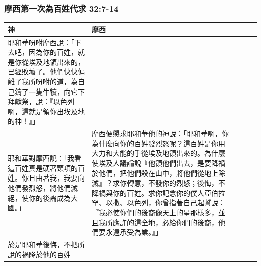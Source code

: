 \begin{table}
\subsubsection{摩西第一次為百姓代求 32:7-14}
\begin{table}[H]
\begin{threeparttable}
\begin{tabular}{@{}p{}*{4}{L{\tabcolsep\relax}}@{}}
\toprule
神 &  摩西 \\\hline
耶和華吩咐摩西說：「下去吧，因為你的百姓，就是你從埃及地領出來的，已經敗壞了。他們快快偏離了我所吩咐的道，為自己鑄了一隻牛犢，向它下拜獻祭，說：『以色列啊，這就是領你出埃及地的神！』」&\tabularnewline\hline
耶和華對摩西說：「我看這百姓真是硬著頸項的百姓。你且由著我，我要向他們發烈怒，將他們滅絕，使你的後裔成為大國。」&摩西便懇求耶和華他的神說：「耶和華啊，你為什麼向你的百姓發烈怒呢？這百姓是你用大力和大能的手從埃及地領出來的。為什麼使埃及人議論說『他領他們出去，是要降禍於他們，把他們殺在山中，將他們從地上除滅』？求你轉意，不發你的烈怒；後悔，不降禍與你的百姓。求你記念你的僕人亞伯拉罕、以撒、以色列，你曾指著自己起誓說：『我必使你們的後裔像天上的星那樣多，並且我所應許的這全地，必給你們的後裔，他們要永遠承受為業。』」\tabularnewline\hline
於是耶和華後悔，不把所說的禍降於他的百姓&\tabularnewline
\bottomrule
\end{tabular}
\end{threeparttable}
\end{table} 



\end{table}
